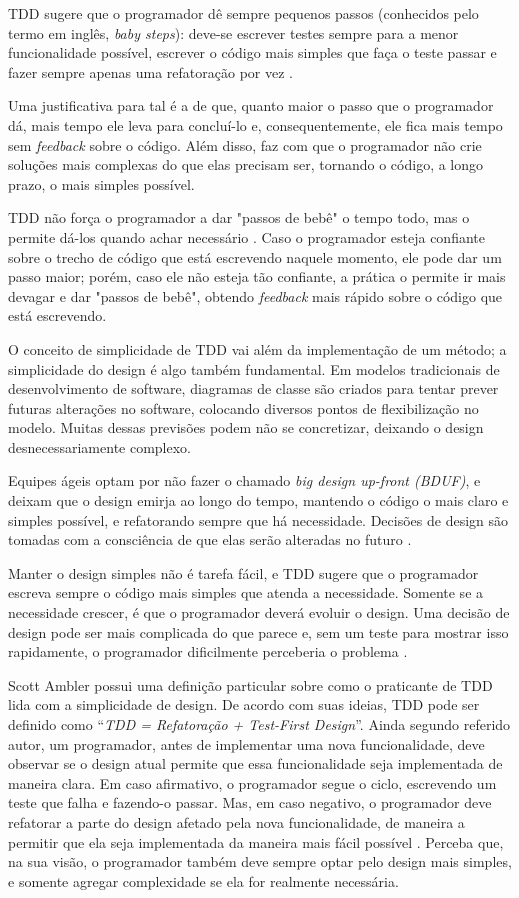 TDD sugere que o programador dê sempre pequenos passos (conhecidos pelo termo em
inglês, \textit{baby steps}): deve-se escrever testes sempre para a menor
funcionalidade possível, escrever o código mais simples que faça o teste passar
e fazer sempre apenas uma refatoração por vez \cite{TDDByExample}.

Uma justificativa para tal é a de que, quanto maior o passo que o programador dá, mais
tempo ele leva para concluí-lo e, consequentemente, ele fica mais tempo
sem \textit{feedback} sobre o código. Além disso, faz com que o programador não crie
soluções mais complexas do que elas precisam ser, tornando o código, a longo
prazo, o mais simples possível.

TDD não força o programador a dar "passos de bebê" o tempo todo, mas o
permite dá-los quando achar necessário
\cite{TDDByExample}. Caso o programador esteja confiante sobre o trecho de
código que está escrevendo naquele momento, ele pode dar um passo maior;  porém,
caso ele não esteja tão confiante, a prática o permite ir mais devagar e 
dar "passos de bebê", obtendo \textit{feedback} mais rápido sobre o código que está
escrevendo.

O conceito de simplicidade de TDD vai além da implementação de um método; a
simplicidade do design é algo também fundamental. Em modelos tradicionais de
desenvolvimento de software, diagramas de classe são criados para tentar prever
futuras alterações no software, colocando diversos pontos de flexibilização no
modelo. Muitas dessas previsões podem não se concretizar, deixando o design
desnecessariamente complexo.

Equipes ágeis optam por não fazer o chamado \textit{big design up-front (BDUF)},
e deixam que o design emirja ao longo do tempo, mantendo o código o mais claro e
simples possível, e refatorando sempre que há necessidade. Decisões de
design são tomadas com a consciência de que elas serão alteradas no futuro
\cite{is-design-dead}.

Manter o design simples não é tarefa fácil, e TDD sugere que o programador
escreva sempre o código mais simples que atenda a necessidade. Somente se a
necessidade crescer, é que o programador deverá evoluir o design. Uma decisão de
design pode ser mais complicada do que parece e, sem um teste para mostrar isso
rapidamente, o programador dificilmente perceberia o problema \cite{aim-fire}.

Scott Ambler possui uma definição particular sobre como o praticante de TDD lida
com a simplicidade de design. De acordo com suas ideias, TDD pode ser definido como
``\textit{TDD = Refatoração + Test-First Design}''. Ainda segundo referido autor, um programador,
antes de implementar uma nova funcionalidade, deve observar se o design atual
permite que essa funcionalidade seja implementada de maneira clara. Em caso
afirmativo, o programador segue o ciclo, escrevendo um teste que falha e
fazendo-o passar. Mas, em caso negativo, o programador deve refatorar a parte do
design afetado pela nova funcionalidade, de maneira a permitir que ela seja
implementada da maneira mais fácil possível \cite{wambler-tdd}. Perceba que, na
sua visão, o programador também deve sempre optar pelo design mais simples, e
somente agregar complexidade se ela for realmente necessária.

